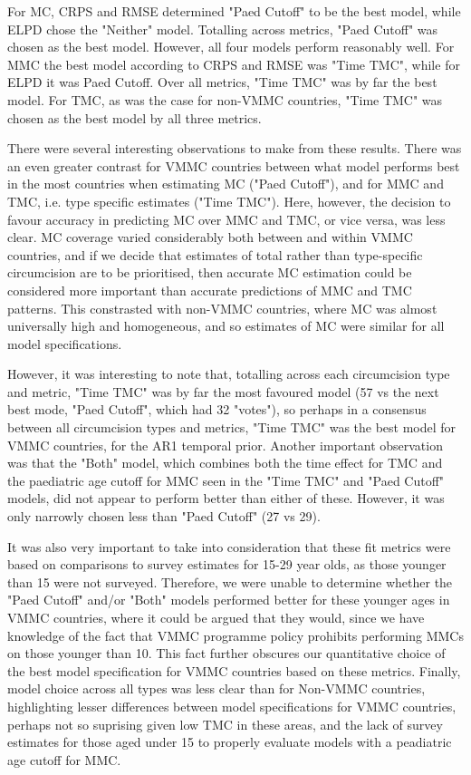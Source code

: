 \documentclass{article}
\begin{document}
For MC, CRPS and RMSE determined "Paed Cutoff" to be the best model, while 
ELPD chose the "Neither" model. 
Totalling across metrics, "Paed Cutoff" was chosen as the best model. However, all four models perform reasonably well. 
For MMC the best model according to CRPS and RMSE was "Time TMC", while for ELPD it was Paed Cutoff. 
Over all metrics, "Time TMC" was by far the best model. 
For TMC, as was the case for non-VMMC countries, "Time TMC" was chosen as the best model by all three metrics. 

There were several interesting observations to make from these results. 
There was an even greater contrast for VMMC countries between what model performs best in the most countries when estimating MC ("Paed Cutoff"), and for MMC and TMC, i.e. type specific estimates ("Time TMC"). 
Here, however, the decision to favour accuracy in predicting MC over MMC and TMC, or vice versa, was less clear. 
MC coverage varied considerably both between and within VMMC countries, and if we decide that estimates of total rather than type-specific circumcision are to be prioritised, then accurate MC estimation could be considered more important than accurate predictions of MMC and TMC patterns. 
This constrasted with non-VMMC countries, where MC was almost universally high and homogeneous, and so estimates of MC were similar for all model specifications. 

However, it was interesting to note that, totalling across each circumcision type and metric, "Time TMC" was by far the most favoured model (57 vs the next best mode, "Paed Cutoff", which had 32 "votes"), so perhaps in a consensus between all circumcision types and metrics, "Time TMC" was the best model for VMMC countries, for the AR1 temporal prior. 
Another important observation was that the "Both" model, which combines both the time effect for TMC and the paediatric age cutoff for MMC seen in the "Time TMC" and "Paed Cutoff" models, did not appear to perform better than either of these. 
However, it was only narrowly chosen less than "Paed Cutoff" (27 vs 29). 

It was also very important to take into consideration that these fit metrics were based on comparisons to survey estimates for 15-29 year olds, as those younger than 15 were not surveyed. 
Therefore, we were unable to determine whether the "Paed Cutoff" and/or "Both" models performed better for these younger ages in VMMC countries, where it could be argued that they would, since we have knowledge of the fact that VMMC programme policy prohibits performing MMCs on those younger than 10. This fact further obscures our quantitative choice of the best model specification for VMMC countries based on these metrics. 
Finally, model choice across all types was less clear than for Non-VMMC  countries, highlighting lesser differences between model specifications for VMMC countries, perhaps not so suprising given low TMC in these areas, and the lack of survey estimates for those aged under 15 to properly evaluate models with a peadiatric age cutoff for MMC. 
\end{document}
